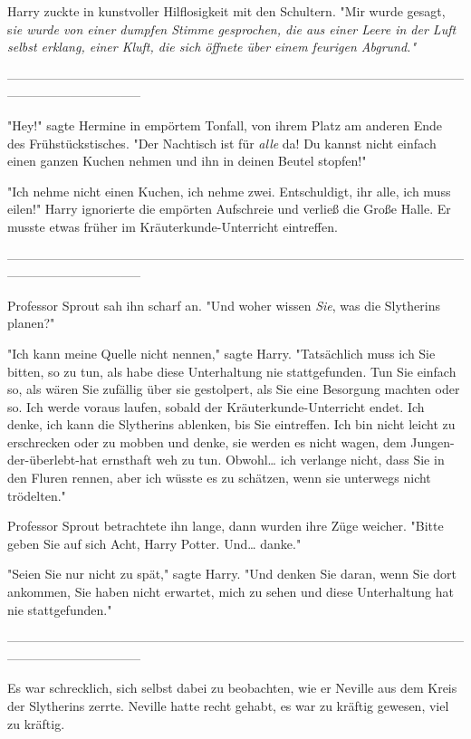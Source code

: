 {Harry zuckte in kunstvoller Hilflosigkeit mit den Schultern. "Mir wurde gesagt, s\emph{ie wurde von einer dumpfen Stimme gesprochen, die aus einer Leere in der Luft selbst erklang, einer Kluft, die sich öffnete über einem feurigen Abgrund."}

--------------------------------------------------------------------------------------------------------------------------------------------

"Hey!" sagte Hermine in empörtem Tonfall, von ihrem Platz am anderen Ende des Frühstückstisches. "Der Nachtisch ist für \emph{alle} da! Du kannst nicht einfach einen ganzen Kuchen nehmen und ihn in deinen Beutel stopfen!"

"Ich nehme nicht einen Kuchen, ich nehme zwei. Entschuldigt, ihr alle, ich muss eilen!" Harry ignorierte die empörten Aufschreie und verließ die Große Halle. Er musste etwas früher im Kräuterkunde-Unterricht eintreffen.

--------------------------------------------------------------------------------------------------------------------------------------------

Professor Sprout sah ihn scharf an. "Und woher wissen \emph{Sie}, was die Slytherins planen?"

"Ich kann meine Quelle nicht nennen," sagte Harry. "Tatsächlich muss ich Sie bitten, so zu tun, als habe diese Unterhaltung nie stattgefunden. Tun Sie einfach so, als wären Sie zufällig über sie gestolpert, als Sie eine Besorgung machten oder so. Ich werde voraus laufen, sobald der Kräuterkunde-Unterricht endet. Ich denke, ich kann die Slytherins ablenken, bis Sie eintreffen. Ich bin nicht leicht zu erschrecken oder zu mobben und denke, sie werden es nicht wagen, dem Jungen-der-überlebt-hat ernsthaft weh zu tun. Obwohl… ich verlange nicht, dass Sie in den Fluren rennen, aber ich wüsste es zu schätzen, wenn sie unterwegs nicht trödelten."

Professor Sprout betrachtete ihn lange, dann wurden ihre Züge weicher. "Bitte geben Sie auf sich Acht, Harry Potter. Und… danke."

"Seien Sie nur nicht zu spät," sagte Harry. "Und denken Sie daran, wenn Sie dort ankommen, Sie haben nicht erwartet, mich zu sehen und diese Unterhaltung hat nie stattgefunden."

--------------------------------------------------------------------------------------------------------------------------------------------

Es war schrecklich, sich selbst dabei zu beobachten, wie er Neville aus dem Kreis der Slytherins zerrte. Neville hatte recht gehabt, es war zu kräftig gewesen, viel zu kräftig.

}
